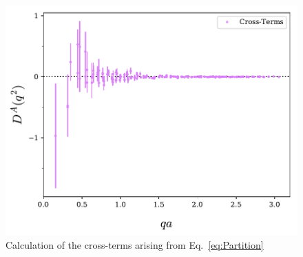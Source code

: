 \begin{figure}[tb]
\centering
\includegraphics[width=\linewidth]{./ScalarGluComp_q2_CrossTerms.pdf}
\caption{\label{fig:CrossTerms} Calculation of the cross-terms arising from Eq.~\ref{eq:Partition}}
\end{figure}

